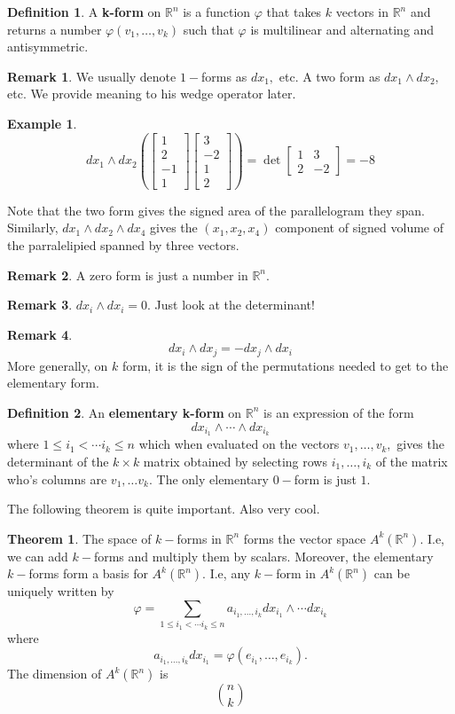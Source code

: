 \documentclass[10pt, oneside]{article}
\newcommand{\bbR}{\mathbb{R}}
\theoremstyle{definition}
\newtheorem{exmp}{Example}[section]
\newtheorem{thm}{Theorem}
\newtheorem{defn}{Definition}
\newtheorem{rem}{Remark}
\begin{document}
\begin{defn}
    A \textbf{k-form} on $\bbR^n$ is a function $\varphi$ that takes $k$ vectors in $\bbR^n$ and returns a number $\varphi(v_1, \dots, v_k)$ such that $\varphi$ is multilinear and alternating and antisymmetric. 
\end{defn}
\begin{rem}
    We usually denote $1-$forms as $dx_1,$ etc. A two form as $dx_1 \wedge dx_2,$ etc. We provide meaning to his wedge operator later.
\end{rem}
\begin{exmp}
    \[dx_1 \wedge dx_2 \left(\begin{bmatrix}  1\\2\\-1\\1  \end{bmatrix}\begin{bmatrix}  3\\-2\\1\\2  \end{bmatrix}\right) = \det\begin{bmatrix}
        1 & 3\\
        2 & -2
    \end{bmatrix} = -8\]
\end{exmp}
Note that the two form gives the signed area of the parallelogram they span. Similarly, $dx_1 \wedge dx_2 \wedge dx_4$ gives the $(x_1, x_2, x_4)$ component of signed volume of the parralelipied spanned by three vectors. 
\begin{rem}
    A zero form is just a number in $\bbR^n.$
\end{rem}
\begin{rem}
    $dx_i \wedge dx_i= 0.$ Just look at the determinant!
\end{rem}
\begin{rem}
    \[dx_i \wedge dx_j = -dx_j \wedge dx_i\] More generally, on  $k$ form, it is the sign of the permutations needed to get to the elementary form.
\end{rem}
\begin{defn}
    An \textbf{elementary k-form} on $\bbR^n$ is an expression of the form 
    \[dx_{i_1}\wedge \cdots \wedge dx_{i_k}\] where $1\leq i_1 < \cdots i_k \leq n$ which when evaluated on the vectors $v_1, \dots, v_k,$ gives the determinant of the $k\times k$ matrix obtained by selecting rows $i_1, \dots, i_k$ of the matrix who's columns are $v_1, \dots v_k.$ The only elementary $0-$form is just $1.$
\end{defn}
The following theorem is quite important. Also very cool.
\begin{thm}
    The space of $k-$forms in $\bbR^n$ forms the vector space $A^k(\bbR^n).$ I.e, we can add $k-$forms and multiply them by scalars. Moreover, the elementary $k-$forms form a basis for $A^k(\bbR^n).$ I.e, any $k-$form in $A^k(\bbR^n)$ can be uniquely written by 
    \[\varphi = \sum_{1\leq i_1 < \cdots i_k \leq n} a_{i_1, \dots, i_k}dx_{i_1}\wedge \cdots dx_{i_k}\] where 
    \[a_{i_1, \dots, i_k}dx_{i_1} = \varphi(e_{i_1}, \dots, e_{i_k}).\] The dimension of $A^k(\bbR^n)$ is 
    \[\binom{n}{k}\]
\end{thm}
\end{document}
